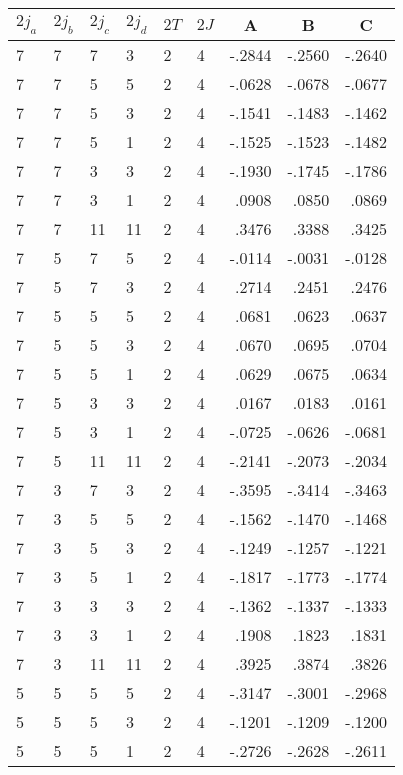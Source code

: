 \clearpage
\small
\begin{center}
\begin{tabular}{llllllrrr}
\hline
$2j_{a}$&$2j_{b}$&$2j_{c}$&$2j_{d}$&$2T$&$2J$&
\multicolumn{1}{c}{A}&
\multicolumn{1}{c}{B}&
\multicolumn{1}{c}{C}
\\\hline
  7& 7& 7& 3& 2& 4&  -.2844&  -.2560&  -.2640\\
  7& 7& 5& 5& 2& 4&  -.0628&  -.0678&  -.0677\\
  7& 7& 5& 3& 2& 4&  -.1541&  -.1483&  -.1462\\
  7& 7& 5& 1& 2& 4&  -.1525&  -.1523&  -.1482\\
  7& 7& 3& 3& 2& 4&  -.1930&  -.1745&  -.1786\\
  7& 7& 3& 1& 2& 4&   .0908&   .0850&   .0869\\
  7& 7&11&11& 2& 4&   .3476&   .3388&   .3425\\
  7& 5& 7& 5& 2& 4&  -.0114&  -.0031&  -.0128\\
  7& 5& 7& 3& 2& 4&   .2714&   .2451&   .2476\\
  7& 5& 5& 5& 2& 4&   .0681&   .0623&   .0637\\
  7& 5& 5& 3& 2& 4&   .0670&   .0695&   .0704\\
  7& 5& 5& 1& 2& 4&   .0629&   .0675&   .0634\\
  7& 5& 3& 3& 2& 4&   .0167&   .0183&   .0161\\
  7& 5& 3& 1& 2& 4&  -.0725&  -.0626&  -.0681\\
  7& 5&11&11& 2& 4&  -.2141&  -.2073&  -.2034\\
  7& 3& 7& 3& 2& 4&  -.3595&  -.3414&  -.3463\\
  7& 3& 5& 5& 2& 4&  -.1562&  -.1470&  -.1468\\
  7& 3& 5& 3& 2& 4&  -.1249&  -.1257&  -.1221\\
  7& 3& 5& 1& 2& 4&  -.1817&  -.1773&  -.1774\\
  7& 3& 3& 3& 2& 4&  -.1362&  -.1337&  -.1333\\
  7& 3& 3& 1& 2& 4&   .1908&   .1823&   .1831\\
  7& 3&11&11& 2& 4&   .3925&   .3874&   .3826\\
  5& 5& 5& 5& 2& 4&  -.3147&  -.3001&  -.2968\\
  5& 5& 5& 3& 2& 4&  -.1201&  -.1209&  -.1200\\
  5& 5& 5& 1& 2& 4&  -.2726&  -.2628&  -.2611\\
\hline
\end{tabular}
\end{center}
